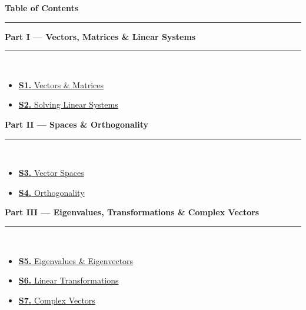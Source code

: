 \documentclass[12pt,a3paper]{article}
\begin{document}
\thispagestyle{fancy}
\begin{center}
  {\LARGE\bfseries\textcolor{pblue}{Table of Contents}}\\[6pt]
  \textcolor{pblue}{\rule{0.6\textwidth}{0.8pt}}
\end{center}
\vspace{6pt}

\begin{tcolorbox}[colback=cA!5,colframe=cA,boxrule=1pt,arc=5pt,
  left=8pt,right=8pt,top=8pt,bottom=8pt,before skip=4pt]
  {\large\bfseries\textcolor{cA}{Part I --- Vectors, Matrices \& Linear Systems}}\\[5pt]
  \textcolor{cA!40}{\rule{\textwidth}{0.4pt}}\\[3pt]
  \small\begin{itemize}[leftmargin=1.2em,itemsep=1pt,label={\textcolor{cA}{$\triangleright$}}]
    \item \hyperref[sec:S1]{\textbf{S1.} Vectors \& Matrices}
    \item \hyperref[sec:S2]{\textbf{S2.} Solving Linear Systems}
  \end{itemize}
\end{tcolorbox}

\begin{tcolorbox}[colback=cB!5,colframe=cB,boxrule=1pt,arc=5pt,
  left=8pt,right=8pt,top=8pt,bottom=8pt,before skip=4pt]
  {\large\bfseries\textcolor{cB}{Part II --- Spaces \& Orthogonality}}\\[5pt]
  \textcolor{cB!40}{\rule{\textwidth}{0.4pt}}\\[3pt]
  \small\begin{itemize}[leftmargin=1.2em,itemsep=1pt,label={\textcolor{cB}{$\triangleright$}}]
    \item \hyperref[sec:S3]{\textbf{S3.} Vector Spaces}
    \item \hyperref[sec:S4]{\textbf{S4.} Orthogonality}
  \end{itemize}
\end{tcolorbox}

\begin{tcolorbox}[colback=cC!5,colframe=cC,boxrule=1pt,arc=5pt,
  left=8pt,right=8pt,top=8pt,bottom=8pt,before skip=4pt]
  {\large\bfseries\textcolor{cC}{Part III --- Eigenvalues, Transformations \& Complex Vectors}}\\[5pt]
  \textcolor{cC!40}{\rule{\textwidth}{0.4pt}}\\[3pt]
  \small\begin{itemize}[leftmargin=1.2em,itemsep=1pt,label={\textcolor{cC}{$\triangleright$}}]
    \item \hyperref[sec:S5]{\textbf{S5.} Eigenvalues \& Eigenvectors}
    \item \hyperref[sec:S6]{\textbf{S6.} Linear Transformations}
    \item \hyperref[sec:S7]{\textbf{S7.} Complex Vectors}
  \end{itemize}
\end{tcolorbox}
\end{document}
